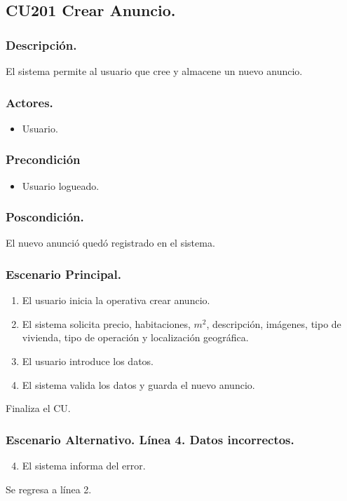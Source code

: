 \subsection{CU201 Crear Anuncio.}
\subsubsection{Descripci\'{o}n.}
El sistema permite al usuario que cree y almacene un nuevo anuncio.
\subsubsection{Actores.}
\begin{itemize}
\item Usuario.
\end{itemize}
\subsubsection{Precondici\'{o}n}
\begin{itemize}
\item Usuario logueado.
\end{itemize}
\subsubsection{Poscondici\'{o}n.}
El nuevo anunci\'{o} qued\'{o} registrado en el sistema.
\subsubsection{Escenario Principal.}
\begin{enumerate}
\item El usuario inicia la operativa crear anuncio.
\item El sistema solicita precio, habitaciones, $m^{2}$, descripci\'{o}n, im\'{a}genes, tipo de vivienda, tipo de operaci\'{o}n y localizaci\'{o}n geogr\'{a}fica.
\item El usuario introduce los datos.
\item El sistema valida los datos y guarda el nuevo anuncio.
\end{enumerate}
Finaliza el CU.
\subsubsection{Escenario Alternativo. L\'{i}nea 4. Datos incorrectos.}
\begin{enumerate}
\setcounter{enumi}{3}
\item El sistema informa del error.
\end{enumerate}
Se regresa a l\'{i}nea 2.
